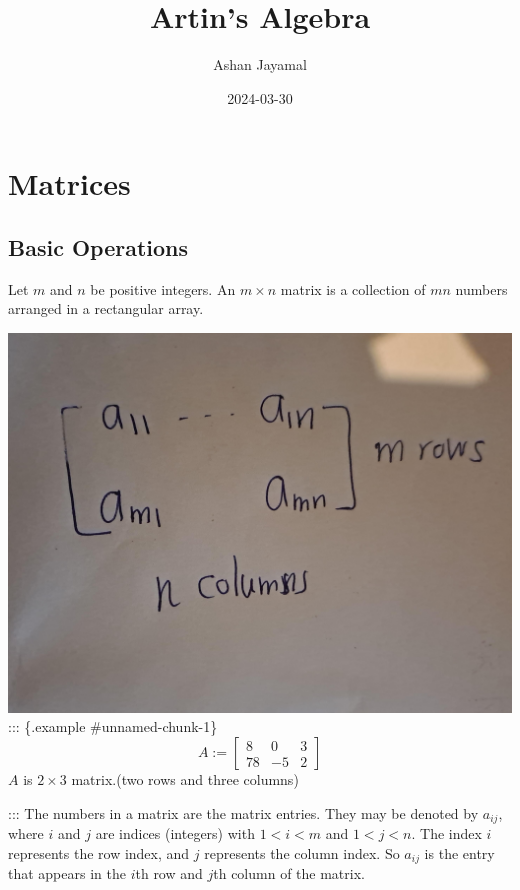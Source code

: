 \documentclass[
]{book}
\title{Artin's Algebra}
\author{Ashan Jayamal}
\date{2024-03-30}
\begin{document}
\frontmatter
\maketitle

\mainmatter
\hypertarget{matrices}{%
\chapter{Matrices}\label{matrices}}

\hypertarget{basic-operations}{%
\section{Basic Operations}\label{basic-operations}}

Let \(m\) and \(n\) be positive integers. An \(m \times n\) matrix is a
collection of \(mn\) numbers arranged in a rectangular array.

\includegraphics{figures/ch_1/fig01.jpg} ::: \{.example
\#unnamed-chunk-1\} \[A:=\begin{bmatrix}
8 & 0 & 3\\
78 & -5 & 2
\end{bmatrix}\] \(A\) is \(2 \times 3\) matrix.(two rows and three
columns)

::: The numbers in a matrix are the matrix entries. They may be denoted
by \(a_{ij}\), where \(i\) and \(j\) are indices (integers) with
\(1 < i < m\) and \(1 < j < n\). The index \(i\) represents the row
index, and \(j\) represents the column index. So \(a_{ij}\) is the entry
that appears in the \(i\)th row and \(j\)th column of the matrix.
\end{document}
